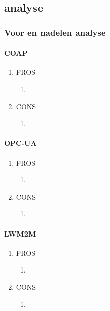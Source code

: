 \subsection{analyse}


\subsubsection{Voor en nadelen analyse}

\paragraph{COAP}
\begin{enumerate}
	\item PROS
	\begin{enumerate}
		\item
	\end{enumerate}
	\item CONS
	\begin{enumerate}
		\item
	\end{enumerate}
\end{enumerate}

\paragraph{OPC-UA}
\begin{enumerate}
	\item PROS
	\begin{enumerate}
		\item
	\end{enumerate}
	\item CONS
	\begin{enumerate}
		\item
	\end{enumerate}
\end{enumerate}
\paragraph{LWM2M}
\begin{enumerate}
	\item PROS
	\begin{enumerate}
		\item
	\end{enumerate}
	\item CONS
	\begin{enumerate}
		\item
	\end{enumerate}
\end{enumerate}



